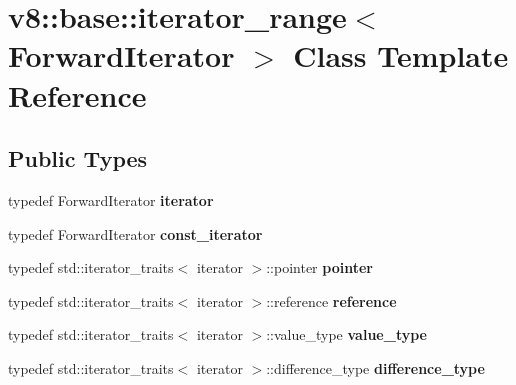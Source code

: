 \hypertarget{classv8_1_1base_1_1iterator__range}{}\section{v8\+:\+:base\+:\+:iterator\+\_\+range$<$ Forward\+Iterator $>$ Class Template Reference}
\label{classv8_1_1base_1_1iterator__range}
\subsection*{Public Types}
\begin{DoxyCompactItemize}
\item 
\mbox{\label{classv8_1_1base_1_1iterator__range_a61cc56d8d64ba12fd0817aa7cd3f8347}} 
typedef Forward\+Iterator {\bfseries iterator}
\item 
\mbox{\label{classv8_1_1base_1_1iterator__range_a5ac9de16cf9b52d1d6f98ef3fc82541b}} 
typedef Forward\+Iterator {\bfseries const\+\_\+iterator}
\item 
\mbox{\label{classv8_1_1base_1_1iterator__range_aacad6428c687d06eab71bc6b50387f3b}} 
typedef std\+::iterator\+\_\+traits$<$ iterator $>$\+::pointer {\bfseries pointer}
\item 
\mbox{\label{classv8_1_1base_1_1iterator__range_abc1cf03db6e2b6e2c0ea5231056e65cf}} 
typedef std\+::iterator\+\_\+traits$<$ iterator $>$\+::reference {\bfseries reference}
\item 
\mbox{\label{classv8_1_1base_1_1iterator__range_a29bd93eb88f1c07be24d6bad30dfb2f0}} 
typedef std\+::iterator\+\_\+traits$<$ iterator $>$\+::value\+\_\+type {\bfseries value\+\_\+type}
\item 
\mbox{\label{classv8_1_1base_1_1iterator__range_aa36c681ac7921849ea7b71f3668f4234}} 
typedef std\+::iterator\+\_\+traits$<$ iterator $>$\+::difference\+\_\+type {\bfseries difference\+\_\+type}
\end{DoxyCompactItemize}
